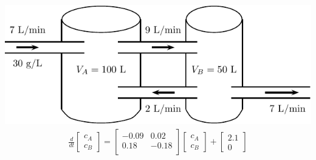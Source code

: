 ~\hfill \begin{minipage}[h]{0.45\linewidth}
\vspace{0pt}
\includegraphics[width=1.0\linewidth]{graphics/notes_09_tanks2}
\LARGE
  \begin{align*}
\frac{d}{dt}    
\begin{bmatrix} c_A \\ c_B 
    \end{bmatrix}
=
\begin{bmatrix}
-0.09 & 0.02 \\
0.18& -0.18 \\
\end{bmatrix}
\begin{bmatrix} c_A \\ c_B 
    \end{bmatrix}
+ 
\begin{bmatrix}
  2.1 \\ 0 
\end{bmatrix}
  \end{align*}
\end{minipage}


\newpage

